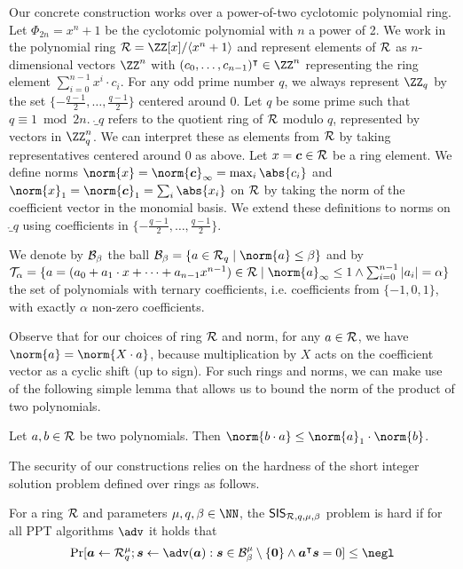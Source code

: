 Our concrete construction works over a power-of-two cyclotomic polynomial ring.
Let $\Phi_{2n} = x^n+1$ be the cyclotomic polynomial with $n$ a power of 2. 
We work in the polynomial ring $\ring =  \ZZ[x]/\langle x^n+1\rangle$ and represent elements of $\mathcal{R}$ as $n$-dimensional vectors $\ZZ^n$ with $(c_0,\dots,c_{n-1})^\intercal\in \ZZ^n$ representing the ring element $\sum_{i=0}^{n-1} x^i \cdot c_i$.
For any odd prime number $q$, we always represent $\ZZ_q$ by the set $\{-\tfrac{q-1}{2},\ldots,\tfrac{q-1}{2}\}$ centered around 0.
Let $q$  be some prime such that $q \equiv 1 \bmod 2n$.
$\ring_q$ refers to the quotient ring of $\mathcal{R}$ modulo $q$, represented by vectors in $\ZZ_q^n$. We can interpret these as elements from $\mathcal{R}$ by taking representatives centered around 0 as above.
Let $x = \boldsymbol{c} \in \mathcal{R}$ be a ring element.
We define norms $\norm{x} = \norm{\vec{c}}_\infty = \max_{i}\abs{c_i}$ and $\norm{x}_1 = \norm{\vec{c}}_1 = \sum_{i}\abs{x_i}$ on $\mathcal{R}$ by taking the norm of the coefficient vector in the monomial basis.
We extend these definitions to norms on $\ring_q$ using coefficients in $\{-\tfrac{q-1}{2},\ldots,\tfrac{q-1}{2}\}$.

We denote by $\mathcal{B}_\beta$ the ball $\ball_\beta = \{a\in\ring_q\mid \norm{a}\leq\beta\}$ and by 
$\tern_\alpha = \{a=(a_0+a_1\cdot x + \dots + a_{n-1}x^{n-1}) \in\ring \mid \norm{a}_\infty\leq 1 \land \sum_{i=0}^{n-1} |a_i| = \alpha\}$ %
the set of polynomials with ternary coefficients, i.e. coefficients from $\{-1,0,1\}$, with exactly $\alpha$ non-zero coefficients.

Observe that for our choices of ring $\mathcal{R}$ and norm, for any $a\in\mathcal{R}$, we have $\norm{a} = \norm{X\cdot a}$, because multiplication by $X$ acts on the coefficient vector as a cyclic shift (up to sign).
For such rings and norms, we can make use of the following simple lemma that allows us to bound the norm of the product of two polynomials.
\begin{lemma}\label{lem:ternbound}
  Let $a,b\in\mathcal{R}$ be two polynomials. Then $\norm{b\cdot a} \leq \norm{a}_1\cdot\norm{b}$.
\end{lemma}

The security of our constructions relies on the hardness of the short integer solution problem defined over rings as follows.
\begin{definition}
  For a ring $\mathcal{R}$ and parameters $\mu,q,\beta \in \NN$, the $\mathsf{SIS}_{\mathcal{R},q,\mu,\beta}$ problem is hard if for all PPT algorithms $\adv$ it holds that
  \[
    \Pr[
      \vec{a} \gets \ring_q^\mu; \vec{s}\gets\adv(\vec{a}) : \vec{s}\in\ball_\beta^\mu\setminus\{\vec{0}\} \land \vec{a}^\intercal\vec{s}=0
    ] \leq \negl
  \]
\end{definition}
